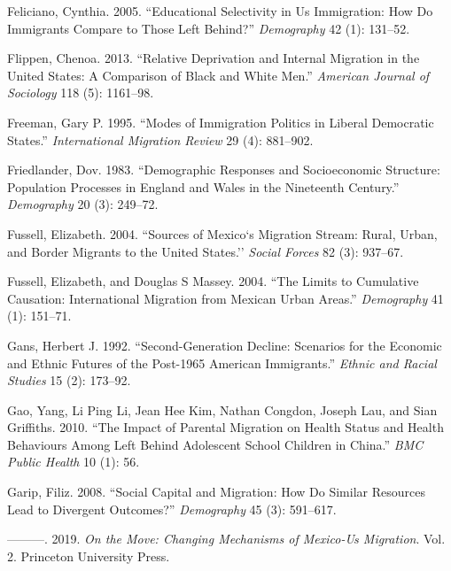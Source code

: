 \documentclass[
]{article}
\begin{document}
\leavevmode\hypertarget{ref-feliciano2005educational}{}%
Feliciano, Cynthia. 2005. ``Educational Selectivity in Us Immigration:
How Do Immigrants Compare to Those Left Behind?'' \emph{Demography} 42
(1): 131--52.

\leavevmode\hypertarget{ref-flippen2013relative}{}%
Flippen, Chenoa. 2013. ``Relative Deprivation and Internal Migration in
the United States: A Comparison of Black and White Men.'' \emph{American
Journal of Sociology} 118 (5): 1161--98.

\leavevmode\hypertarget{ref-freeman1995modes}{}%
Freeman, Gary P. 1995. ``Modes of Immigration Politics in Liberal
Democratic States.'' \emph{International Migration Review} 29 (4):
881--902.

\leavevmode\hypertarget{ref-friedlander1983demographic}{}%
Friedlander, Dov. 1983. ``Demographic Responses and Socioeconomic
Structure: Population Processes in England and Wales in the Nineteenth
Century.'' \emph{Demography} 20 (3): 249--72.

\leavevmode\hypertarget{ref-fussell2004sources}{}%
Fussell, Elizabeth. 2004. ``Sources of Mexico`s Migration Stream: Rural,
Urban, and Border Migrants to the United States.'' \emph{Social Forces}
82 (3): 937--67.

\leavevmode\hypertarget{ref-fussell2004limits}{}%
Fussell, Elizabeth, and Douglas S Massey. 2004. ``The Limits to
Cumulative Causation: International Migration from Mexican Urban
Areas.'' \emph{Demography} 41 (1): 151--71.

\leavevmode\hypertarget{ref-gans1992second}{}%
Gans, Herbert J. 1992. ``Second-Generation Decline: Scenarios for the
Economic and Ethnic Futures of the Post-1965 American Immigrants.''
\emph{Ethnic and Racial Studies} 15 (2): 173--92.

\leavevmode\hypertarget{ref-gao2010impact}{}%
Gao, Yang, Li Ping Li, Jean Hee Kim, Nathan Congdon, Joseph Lau, and
Sian Griffiths. 2010. ``The Impact of Parental Migration on Health
Status and Health Behaviours Among Left Behind Adolescent School
Children in China.'' \emph{BMC Public Health} 10 (1): 56.

\leavevmode\hypertarget{ref-garip2008social}{}%
Garip, Filiz. 2008. ``Social Capital and Migration: How Do Similar
Resources Lead to Divergent Outcomes?'' \emph{Demography} 45 (3):
591--617.

\leavevmode\hypertarget{ref-garip2019move}{}%
---------. 2019. \emph{On the Move: Changing Mechanisms of Mexico-Us
Migration}. Vol. 2. Princeton University Press.
\end{document}
